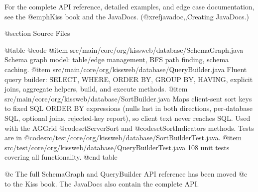 For the complete API reference, detailed examples, and edge case
documentation, see the @emph{Kiss} book and the JavaDocs.
(@xref{javadoc,,Creating JavaDocs}.)

@section Source Files

@table @code
@item src/main/core/org/kissweb/database/SchemaGraph.java
Schema graph model: table/edge management, BFS path finding, schema
caching.
@item src/main/core/org/kissweb/database/QueryBuilder.java
Fluent query builder: SELECT, WHERE, ORDER BY, GROUP BY, HAVING,
explicit joins, aggregate helpers, build, and execute methods.
@item src/main/core/org/kissweb/database/SortBuilder.java
Maps client-sent sort keys to fixed SQL ORDER BY expressions (nulls last in
both directions, per-database SQL, optional joins, rejected-key report), so
client text never reaches SQL.  Used with the AGGrid @code{setServerSort}
and @code{setSortIndicators} methods.  Tests are in
@code{src/test/core/org/kissweb/database/SortBuilderTest.java}.
@item src/test/core/org/kissweb/database/QueryBuilderTest.java
108 unit tests covering all functionality.
@end table

@c The full SchemaGraph and QueryBuilder API reference has been moved
@c to the Kiss book.  The JavaDocs also contain the complete API.
